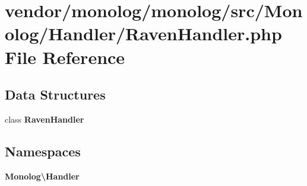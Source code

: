 \section{vendor/monolog/monolog/src/\+Monolog/\+Handler/\+Raven\+Handler.php File Reference}
\label{_raven_handler_8php}
\subsection*{Data Structures}
\begin{DoxyCompactItemize}
\item 
class {\bf Raven\+Handler}
\end{DoxyCompactItemize}
\subsection*{Namespaces}
\begin{DoxyCompactItemize}
\item 
 {\bf Monolog\textbackslash{}\+Handler}
\end{DoxyCompactItemize}
